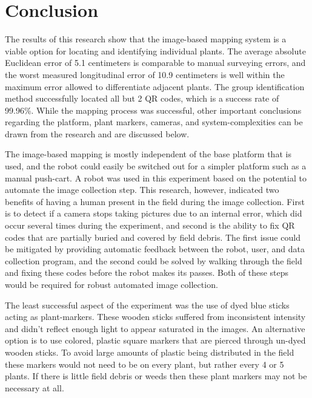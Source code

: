 
\cleardoublepage

\chapter{Conclusion}
\label{chapter:conclusion}

The results of this research show that the image-based mapping system is a viable option for locating and identifying individual plants.  The average absolute Euclidean error of 5.1 centimeters is comparable to manual surveying errors, and the worst measured longitudinal error of 10.9 centimeters is well within the maximum error allowed to differentiate adjacent plants.  The group identification method successfully located all but 2 QR codes, which is a success rate of 99.96\%.  While the mapping process was successful, other important conclusions regarding the platform, plant markers, cameras, and system-complexities can be drawn from the research and are discussed below.

The image-based mapping is mostly independent of the base platform that is used, and the robot could easily be switched out for a simpler platform such as a manual push-cart.  A robot was used in this experiment based on the potential to automate the image collection step.  This research, however, indicated two benefits of having a human present in the field during the image collection.  First is to detect if a camera stops taking pictures due to an internal error, which did occur several times during the experiment, and second is the ability to fix QR codes that are partially buried and covered by field debris.  The first issue could be mitigated by providing automatic feedback between the robot, user, and data collection program, and the second could be solved by walking through the field and fixing these codes before the robot makes its passes.  Both of these steps would be required for robust automated image collection.       

The least successful aspect of the experiment was the use of dyed blue sticks acting as plant-markers.  These wooden sticks suffered from inconsistent intensity and didn't reflect enough light to appear saturated in the images.  An alternative option is to use colored, plastic square markers that are pierced through un-dyed wooden sticks.  To avoid large amounts of plastic being distributed in the field these markers would not need to be on every plant, but rather every 4 or 5 plants.  If there is little field debris or weeds then these plant markers may not be necessary at all. 

